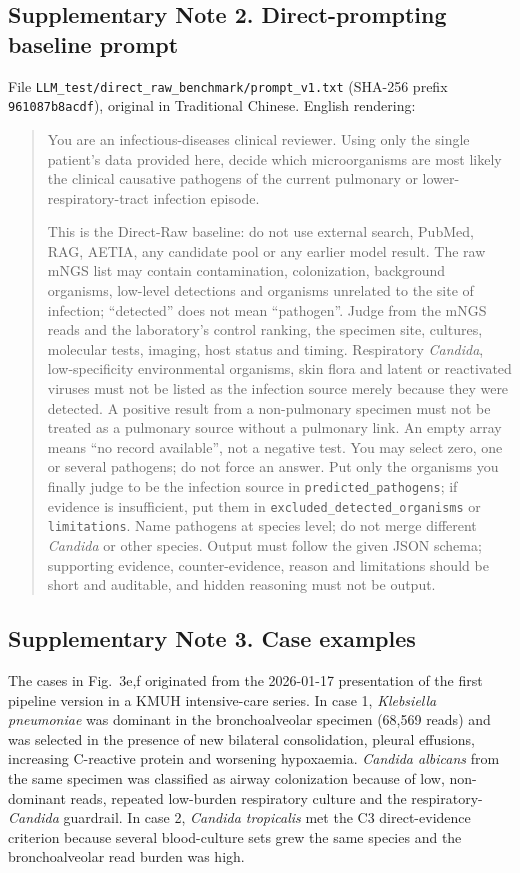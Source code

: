 \documentclass[11pt,a4paper]{article}
\newcommand{\mngs}{mNGS\xspace}
\newcommand{\kmuh}{KMUH\xspace}
\begin{document}
\subsection*{Supplementary Note 2. Direct-prompting baseline prompt}
File \texttt{LLM\_test/direct\_raw\_benchmark/prompt\_v1.txt} (SHA-256 prefix \texttt{961087b8acdf}), original in Traditional Chinese. English rendering:

\begin{quote}\small
You are an infectious-diseases clinical reviewer. Using only the single patient's data provided here, decide which microorganisms are most likely the clinical causative pathogens of the current pulmonary or lower-respiratory-tract infection episode.

This is the Direct-Raw baseline: do not use external search, PubMed, RAG, AETIA, any candidate pool or any earlier model result. The raw \mngs list may contain contamination, colonization, background organisms, low-level detections and organisms unrelated to the site of infection; ``detected'' does not mean ``pathogen''. Judge from the \mngs reads and the laboratory's control ranking, the specimen site, cultures, molecular tests, imaging, host status and timing. Respiratory \textit{Candida}, low-specificity environmental organisms, skin flora and latent or reactivated viruses must not be listed as the infection source merely because they were detected. A positive result from a non-pulmonary specimen must not be treated as a pulmonary source without a pulmonary link. An empty array means ``no record available'', not a negative test. You may select zero, one or several pathogens; do not force an answer. Put only the organisms you finally judge to be the infection source in \texttt{predicted\_pathogens}; if evidence is insufficient, put them in \texttt{excluded\_detected\_organisms} or \texttt{limitations}. Name pathogens at species level; do not merge different \textit{Candida} or other species. Output must follow the given JSON schema; supporting evidence, counter-evidence, reason and limitations should be short and auditable, and hidden reasoning must not be output.
\end{quote}

\subsection*{Supplementary Note 3. Case examples}
The cases in Fig.~3e,f originated from the 2026-01-17 presentation of the first pipeline version in a \kmuh intensive-care series. In case 1, \textit{Klebsiella pneumoniae} was dominant in the bronchoalveolar specimen (68,569 reads) and was selected in the presence of new bilateral consolidation, pleural effusions, increasing C-reactive protein and worsening hypoxaemia. \textit{Candida albicans} from the same specimen was classified as airway colonization because of low, non-dominant reads, repeated low-burden respiratory culture and the respiratory-\textit{Candida} guardrail. In case 2, \textit{Candida tropicalis} met the C3 direct-evidence criterion because several blood-culture sets grew the same species and the bronchoalveolar read burden was high.
\end{document}
